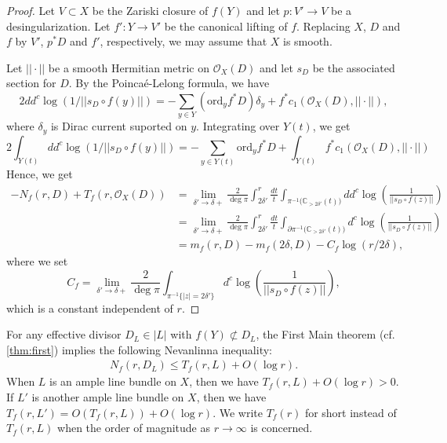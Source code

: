 \documentclass[11pt,english]{smfart}
\theoremstyle{plain}
\theoremstyle{definition}
\theoremstyle{remark}
\numberwithin{equation}{section}
\theoremstyle{plain}
\begin{document}
	\begin{proof}
		Let $V\subset X$ be the Zariski closure of $f(Y)$ and let $p:V'\to V$ be a desingularization.
		Let $f':Y\to V'$ be the canonical lifting of $f$.
		Replacing $X$, $D$ and $f$ by $V'$, $p^*D$ and $f'$, respectively, we may assume that $X$ is smooth.
		\par
		
		
		Let $||\cdot ||$ be a smooth Hermitian metric on $\mathcal{O}_X(D)$ and let $s_D$ be the associated section for $D$.
		By the Poinca{\'e}-Lelong formula, we have 
		$$2dd^c\log (1/||s_D\circ f(y)||)=-\sum_{y\in Y}(\mathrm{ord}_yf^{*}D)\delta _y+f^{*}c_1(\mathcal{O}_X(D),||\cdot ||),$$
		where $\delta_y$ is Dirac current suported on $y$.
		Integrating over $Y(t)$, we get 
		$$
		2\int_{Y(t)}dd^c\log (1/||s_D\circ f(y)||)=-\sum_{y\in Y(t)}\mathrm{ord}_yf^{*}D+\int_{Y(t)}f^{*}c_1(\mathcal{O}_X(D), ||\cdot ||)
		$$
		Hence, we get
		\begin{equation*}
			\begin{split}
				-N_f(r,D)+T_f(r,\mathcal{O}_X(D))
				&=\lim_{\delta'\to \delta+}\frac{2}{\deg\pi}\int_{2\delta'}^r\frac{dt}{t}\int_{\pi^{-1}\big( \mathbb C_{>2\delta'}(t) \big)}dd^c\log \left( \frac{1}{||s_D\circ f(z)||}\right)\\
				&=\lim_{\delta'\to \delta+}\frac{2}{\deg\pi}\int_{2\delta'}^r\frac{dt}{t}\int_{\partial \pi^{-1}\big( \mathbb C_{>2\delta'}(t) \big)}d^c\log \left( \frac{1}{||s_D\circ f(z)||}\right)\\
				&=m_f(r,D)-m_f(2\delta,D)-C_f\log (r/2\delta),
			\end{split}
		\end{equation*}
		where we set
		$$
		C_f=\lim_{\delta'\to \delta+}\frac{2}{\deg\pi}\int_{\pi^{-1}\{ |z|=2\delta'\}}d^c\log \left( \frac{1}{||s_D\circ f(z)||}\right),$$
		which is a constant independent of $r$. 
	\end{proof}
	
	
	
	
	
	For any effective divisor $D_L \in  |L|$ with $f(Y)\not\subset D_L$,  the First Main theorem (cf. \cref{thm:first}) implies the following Nevanlinna inequality:
	\begin{align}\label{eqn:20221120}
		N_f(r, D_L) \leqslant T_f(r, L)+O(\log r) .
	\end{align}
	When $L$ is an ample line bundle on $X$, then we have $T_f(r,L)+O(\log r)>0$.
	If $L'$ is another ample line bundle on $X$, then we have $T_f(r,L')=O(T_f(r,L))+O(\log r)$.
	We write $T_f(r)$ for short instead of $T_f(r,L)$ when the order of magnitude as $r\to\infty$ is concerned.
	
\end{document}
